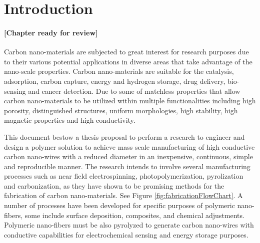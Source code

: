 
\chapter{Introduction} %

\label{Chapter:Introduction}

\subsubsection*{\color{mygray}[Chapter ready for review]}

Carbon nano-materials are subjected to great interest for research purposes due to their various potential applications in diverse areas that take advantage of the nano-scale properties. \cite{Siddiqui2019} Carbon nano-materials are suitable for the catalysis, adsorption, carbon capture, energy and hydrogen storage, drug delivery, bio-sensing and cancer detection. \cite{Siddiqui2019} Due to some of matchless properties that allow carbon nano-materials to be utilized within multiple functionalities including high porosity, distinguished structures, uniform morphologies, high stability, high magnetic properties and high conductivity. \cite{Siddiqui2019}

This document bestow a thesis proposal to perform a research to engineer and design a polymer solution to achieve mass scale manufacturing of high conductive carbon nano-wires with a reduced diameter in an inexpensive, continuous, simple and reproducible manner. The research intends to involve several manufacturing processes such as near field electrospinning, photopolymerization, pyrolization and carbonization, as they have shown to be promising methods for the fabrication of carbon nano-materials. \cite{Cardenas2017} See Figure \ref{fig:fabricationFlowChart}. A number of processes have been developed for specific purposes of polymeric nano-fibers, some include surface deposition, composites, and chemical adjustments. Polymeric nano-fibers must be also pyrolyzed to generate carbon nano-wires with conductive capabilities \cite{Madou2011} for electrochemical sensing and energy storage purposes.

